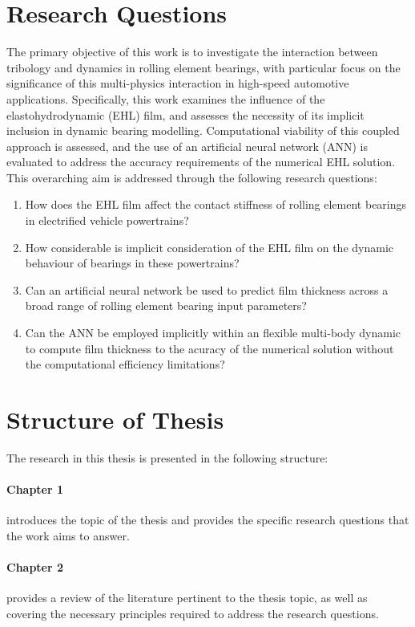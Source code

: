 \section{Research Questions} \label{Research Questions}

The primary objective of this work is to investigate the interaction between tribology and dynamics in rolling element bearings, with particular focus on the significance of this multi-physics interaction in high-speed automotive applications. Specifically, this work examines the influence of the elastohydrodynamic (EHL) film, and assesses the necessity of its implicit inclusion in dynamic bearing modelling. Computational viability of this coupled approach is assessed, and the use of an artificial neural network (ANN) is evaluated to address the accuracy requirements of the numerical EHL solution. This overarching aim is addressed through the following research questions:

\begin{enumerate}
	\item How does the EHL film affect the contact stiffness of rolling element bearings in electrified vehicle powertrains?
	\item How considerable is implicit consideration of the EHL film on the dynamic behaviour of bearings in these powertrains?
	\item Can an artificial neural network be used to predict film thickness across a broad range of rolling element bearing input parameters?
	\item Can the ANN be employed implicitly within an flexible multi-body dynamic to compute film thickness to the acuracy of the numerical solution without the computational efficiency limitations? 
\end{enumerate}


\section{Structure of Thesis} \label{Structure of Thesis}

The research in this thesis is presented in the following structure:

\paragraph{Chapter 1} introduces the topic of the thesis and provides the specific research questions that the work aims to answer.

\paragraph{Chapter 2} provides a review of the literature pertinent to the thesis topic, as well as covering the necessary principles required to address the research questions.

